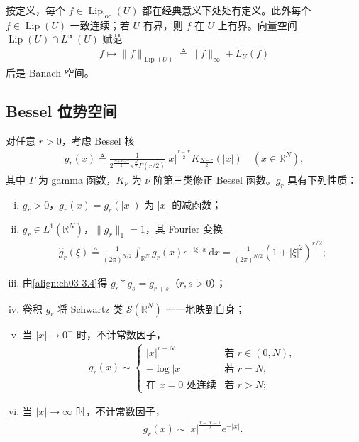 \documentclass[../../main.tex]{subfiles}%
\begin{document}
按定义，每个 $f\in\operatorname{Lip}_{\mathrm{loc}}(U)$ 都在经典意义下处处有定义。此外每个 $f\in\operatorname{Lip}(U)$ 一致连续；若 $U$ 有界，则 $f$ 在 $U$ 上有界。向量空间 $\operatorname{Lip}(U)\cap L^\infty(U)$ 赋范
\begin{align*}
f\mapsto\|f\|_{\operatorname{Lip}(U)}\triangleq\|f\|_\infty+L_U(f)
\end{align*}
后是 Banach 空间。

\subsection{Bessel 位势空间}\label{subsection:ch03-Bessel位势}

对任意 $r>0$，考虑 Bessel 核
\begin{align}
g_r(x)\triangleq \frac{1}{2^{\frac{N+r-2}{2}}\pi^{\frac{N}{2}}\Gamma(r/2)}|x|^{\frac{r-N}{2}}K_{\frac{N-r}{2}}(|x|)
\quad (x\in\mathbb{R}^N),\label{align:ch03-3.3}
\end{align}
其中 $\Gamma$ 为 gamma 函数，$K_\nu$ 为 $\nu$ 阶第三类修正 Bessel 函数。$g_r$ 具有下列性质：
\begin{enumerate}[(i)]
\item $g_r>0$，$g_r(x)=g_r(|x|)$ 为 $|x|$ 的减函数；
\item $g_r\in L^1(\mathbb{R}^N)$，$\|g_r\|_1=1$，其 Fourier 变换
\begin{align}
\widehat g_r(\xi)\triangleq \frac{1}{(2\pi)^{N/2}}\int_{\mathbb{R}^N}g_r(x)e^{-\mathrm{i}\xi\cdot x}\,\mathrm{d}x
=\frac{1}{(2\pi)^{N/2}}(1+|\xi|^2)^{r/2};\label{align:ch03-3.4}
\end{align}
\item 由\eqref{align:ch03-3.4}得 $g_r*g_s=g_{r+s}$（$r,s>0$）；
\item 卷积 $g_r$ 将 Schwartz 类 $\mathcal{S}(\mathbb{R}^N)$ 一一地映到自身；
\item 当 $|x|\to0^+$ 时，不计常数因子，
\begin{align}
g_r(x)\sim\begin{cases}
|x|^{r-N} & \text{若 }r\in(0,N),\\
-\log|x| & \text{若 }r=N,\\
\text{在 }x=0\text{ 处连续} & \text{若 }r>N;
\end{cases}
\label{align:ch03-3.5}
\end{align}
\item 当 $|x|\to\infty$ 时，不计常数因子，
\begin{align}
g_r(x)\sim|x|^{\frac{r-N-1}{2}}e^{-|x|}.\label{align:ch03-3.6}
\end{align}
\end{enumerate}
\end{document}
